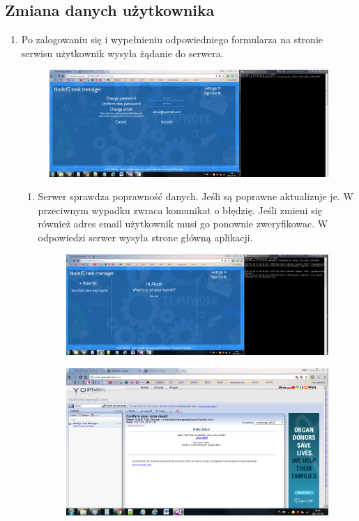 \documentclass[12pt]{report}
\begin{document}
\begin{enumerate}
\begin{enumerate}
\subsection{Zmiana danych użytkownika}
\begin{enumerate}
\item Po zalogowaniu się i wypełnieniu odpowiedniego formularza na stronie serwisu użytkownik wysyła żądanie do serwera.
\begin{figure}[!t]
\centering
\includegraphics{61.png}
\end{figure}
\begin{enumerate}
\item Serwer sprawdza poprawność danych. Jeśli są poprawne aktualizuje je.
W przeciwnym wypadku zwraca komunikat o błędzię. 
Jeśli zmieni się również adres email użytkownik musi go ponownie zweryfikowac. 
W odpowiedzi serwer wysyła strone główną aplikacji.
\begin{figure}[!t]
\centering
\includegraphics{62.png}
\end{figure}
\begin{figure}[!t]
\centering
\includegraphics{63.png}
\end{figure}
\end{enumerate}


\end{enumerate}
\end{enumerate}
\end{enumerate}
\end{document}
